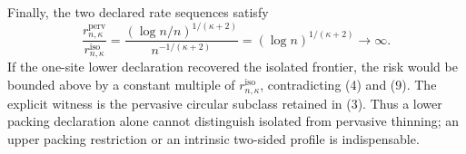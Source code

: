 Finally, the two declared rate sequences satisfy
\[
 \frac{r_{n,\kappa}^{\mathrm{perv}}}
 {r_{n,\kappa}^{\mathrm{iso}}}
 =\frac{(\log n/n)^{1/(\kappa+2)}}
 {n^{-1/(\kappa+2)}}
 =(\log n)^{1/(\kappa+2)}\longrightarrow\infty. \tag{9}
\]
If the one-site lower declaration recovered the isolated frontier, the risk would be bounded above by a constant multiple of \(r_{n,\kappa}^{\mathrm{iso}}\), contradicting (4) and (9).  The explicit witness is the pervasive circular subclass retained in (3).  Thus a lower packing declaration alone cannot distinguish isolated from pervasive thinning; an upper packing restriction or an intrinsic two-sided profile is indispensable.